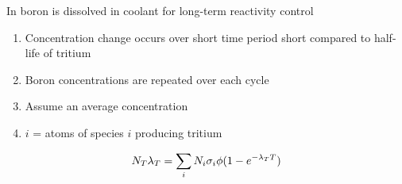 \documentclass[aspectratio=1610,pdftex,dvipsnames,compress,xcolor={dvipsnames}]{beamer}
\newcommand{\acsp}{\acrshortpl} %
\begin{document}
\begin{frame}{In \acsp{pwr} boron is dissolved in coolant for long-term reactivity control}
    \begin{enumerate}[series=outerlist,topsep=0pt,itemsep=21pt,leftmargin=*,label=(\arabic*)]
        \item[]Concentration change occurs over short time period short compared to half-life of tritium
        \item[]Boron concentrations are repeated over each cycle
        \item[]Assume an average concentration
        \item[]$i$ = atoms of species $i$ producing tritium
    \end{enumerate}
    
    \vspace*{\fill}

    \begin{equation}
        \LARGE
        N_T\lambda_T=\sum_i N_i\sigma_i\phi(1-e^{-\lambda_T T})
    \end{equation}
\end{frame}
\end{document}
